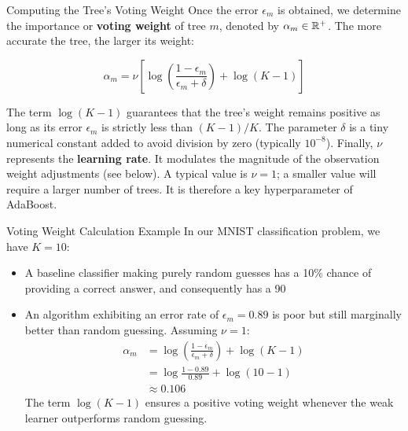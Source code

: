 \begin{frame}{Computing the Tree's Voting Weight}
	Once the error $\epsilon_m$ is obtained, we determine the importance or \textbf{voting weight} of tree $m$, denoted by $\alpha_m \in \mathbb{R}^+$. The more accurate the tree, the larger its weight:
	
	\begin{equation*}
		\alpha_m = \nu \left[\log \left( \frac{1 - \epsilon_m}{\epsilon_m + \delta} \right) + \log(K - 1)\right]
	\end{equation*}
	
	\pause
	\vspace{0.3cm}
	The term $\log(K - 1)$ guarantees that the tree's weight remains positive as long as its error $\epsilon_m$ is strictly less than $(K-1)/K$. The parameter $\delta$ is a tiny numerical constant added to avoid division by zero (typically $10^{-8}$). Finally, $\nu$ represents the \textbf{learning rate}. It modulates the magnitude of the observation weight adjustments (see below). A typical value is $\nu = 1$; a smaller value will require a larger number of trees. It is therefore a key hyperparameter of AdaBoost.
\end{frame}

\begin{frame}{Voting Weight Calculation Example}
	In our MNIST classification problem, we have $K = 10$:
	\begin{itemize}
		\item A baseline classifier making purely random guesses has a 10\% chance of providing a correct answer, and consequently has a 90%
		\item An algorithm exhibiting an error rate of $\epsilon_m = 0.89$ is poor but still marginally better than random guessing. Assuming $\nu = 1$:
		\begin{equation*}
			\begin{aligned}
				\alpha_m 
				&= \log \left( \frac{1 - \epsilon_m}{\epsilon_m + \delta} \right) + \log(K - 1) \\
				&= \log \frac{1 - 0.89}{0.89} + \log(10 - 1) \\
				&\approx 0.106
			\end{aligned}
		\end{equation*}
		The term $\log(K - 1)$ ensures a positive voting weight whenever the weak learner outperforms random guessing.
	\end{itemize}
\end{frame}

